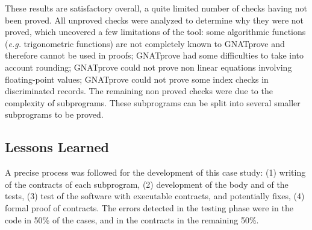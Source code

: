 \documentclass[10pt,a4paper,twocolumn]{article}
\newcommand{\gnatprove}{GNATprove\xspace}
\newcommand{\eg}{\textit{e.g.}\xspace}
\begin{document}
These results are satisfactory overall, a quite limited number of
checks having not been proved. All unproved checks were analyzed to
determine why they were not proved, which uncovered a few limitations
of the tool: some algorithmic functions (\eg trigonometric functions)
are not completely known to \gnatprove and therefore cannot be used in
proofs; \gnatprove had some difficulties to take into account
rounding;
\gnatprove could not prove non linear equations involving
floating-point values;
\gnatprove could not prove some index checks in discriminated records.
The remaining non proved checks were due to the complexity of subprograms.
These subprograms can be split into several smaller subprograms to be
proved.


\subsection{Lessons Learned}

A precise process was followed for the development of this case study:
(1) writing of the contracts of each subprogram,
(2) development of the body and of the tests,
(3) test of the software with executable contracts, and potentially fixes,
(4) formal proof of contracts.
The errors detected in the testing phase were in the code
in 50\% of the cases, and in the contracts in the remaining 50\%.
\end{document}
